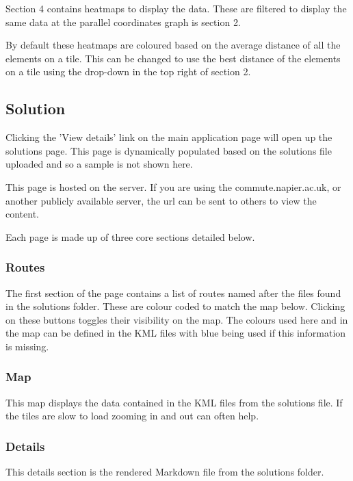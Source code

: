 Section 4 contains heatmaps to display the data.  These are filtered to display the same data at the parallel coordinates graph is section 2.

By default these heatmaps are coloured based on the average distance of all the elements on a tile.  This can be changed to use the best distance of the elements on a tile using the drop-down in the top right of section 2.


\subsection{Solution}

Clicking the 'View details' link on the main application page will open up the solutions page.  This page is dynamically populated based on the solutions file uploaded and so a sample is not shown here.

This page is hosted on the server.  If you are using the commute.napier.ac.uk, or another publicly available server, the url can be sent to others to view the content.

Each page is made up of three core sections detailed below.

\subsubsection{Routes}

The first section of the page contains a list of routes named after the files found in the solutions folder.  These are colour coded to match the map below.  Clicking on these buttons toggles their visibility on the map.  The colours used here and in the map can be defined in the KML files with blue being used if this information is missing.

\subsubsection{Map}

This map displays the data contained in the KML files from the solutions file.  If the tiles are slow to load zooming in and out can often help.

\subsubsection{Details}

This details section is the rendered Markdown file from the solutions folder.
